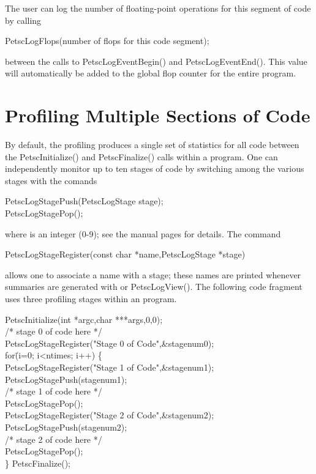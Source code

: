 {{The user can log the number of floating-point operations
for this segment of code by calling
\begin{tabbing}
    PetscLogFlops(number of flops for this code segment);
\end{tabbing}
between the calls to PetscLogEventBegin() and PetscLogEventEnd().
This value will automatically be added to the global flop counter for the
entire program.

\section{Profiling Multiple Sections of Code}
\label{sec_profstages}

By default, the profiling produces a single set of statistics for all
code between the PetscInitialize() and PetscFinalize()
calls within a program.  One can independently monitor up to ten
stages of code by switching among the various stages with the comands
\begin{tabbing}
   PetscLogStagePush(PetscLogStage stage);\\
   PetscLogStagePop();
\end{tabbing}
where  is an integer (0-9); see the manual pages for details.
The command
\begin{tabbing}
   PetscLogStageRegister(const char *name,PetscLogStage *stage)
\end{tabbing}
allows one to associate a name with a stage; these names are printed whenever
summaries are generated with  or PetscLogView().
The following code fragment uses three profiling stages within an program.

\begin{tabbing}
   PetscInitialize(int *argc,char ***args,0,0);\\
   /* stage 0 of code here */\\
   PetscLogStageRegister("Stage 0 of Code",\&stagenum0);\\
   for\= (i=0; i<ntimes; i++) \{\\
      \>PetscLogStageRegister("Stage 1 of Code",\&stagenum1);\\
      \>PetscLogStagePush(stagenum1);\\
      \>/* stage 1 of code here */\\
      \>PetscLogStagePop();\\
      \>PetscLogStageRegister("Stage 2 of Code",\&stagenum2);\\
      \>PetscLogStagePush(stagenum2);\\
      \>/* stage 2 of code here */\\
      \>PetscLogStagePop();\\
   \}
   PetscFinalize();
\end{tabbing}

}}
